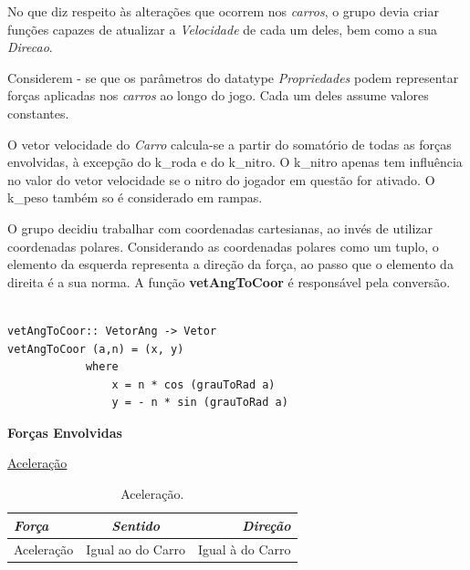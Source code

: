 \documentclass[a4paper]{report} %
\begin{document}
No que diz respeito às alterações que ocorrem nos \emph{carros}, o grupo devia criar funções capazes de atualizar a \emph{Velocidade} de cada um deles, bem como a sua \emph{Direcao}.

Considerem - se que os parâmetros do {datatype} \emph{Propriedades} podem representar forças aplicadas nos \emph{carros} ao longo do jogo. Cada um deles assume valores constantes.

O vetor velocidade do \emph{Carro} calcula-se a partir do somatório de todas as forças envolvidas, à excepção do k_roda e do k_nitro. O k_nitro apenas tem influência no valor do vetor velocidade se o nitro do jogador em questão for ativado. O k_peso também so é considerado em rampas.

O grupo decidiu trabalhar com coordenadas cartesianas, ao invés de utilizar coordenadas polares. Considerando as coordenadas polares como um tuplo, o elemento da esquerda representa a direção da força, ao passo que o elemento da direita é a sua norma. A função \textbf{vetAngToCoor} é responsável pela conversão.

\begin{verbatim}

vetAngToCoor:: VetorAng -> Vetor
vetAngToCoor (a,n) = (x, y)
            where
                x = n * cos (grauToRad a)
                y = - n * sin (grauToRad a)

\end{verbatim}



\maketitle\textbf{Forças Envolvidas}

\maketitle\underline{Aceleração}
\begin{table}[!h]
\begin{center}
\begin{tabular}{|l|c|r|}
    
    \hline
  \emph{Força} & \emph{Sentido} & \emph{Direção} \\
    \hline
  Aceleração & Igual ao do Carro & Igual à do Carro \\
    \hline

\end{tabular}
\end{center}
\caption{Aceleração.}
\end{table}
\end{document}
